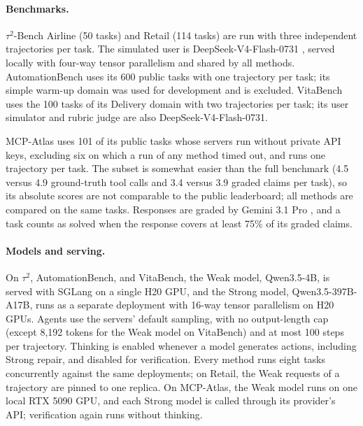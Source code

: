 \documentclass[11pt, copyright, logo, secondlogo]{template/lark}
\begin{document}
\paragraph{Benchmarks.}
$\tau^2$-Bench Airline (50 tasks) and Retail (114 tasks) are run with three
independent trajectories per task. The simulated user is
DeepSeek-V4-Flash-0731 \citep{deepseek2026v4}, served locally with four-way tensor parallelism and
shared by all methods. AutomationBench uses its 600 public tasks with one
trajectory per task; its simple warm-up domain was used for development and
is excluded. VitaBench uses the 100 tasks of its Delivery domain with two
trajectories per task; its user simulator and rubric judge
are also DeepSeek-V4-Flash-0731.

MCP-Atlas uses 101 of its public tasks whose servers run without private API
keys, excluding six on which a run of any method timed out, and
runs one trajectory per task. The subset is somewhat easier than the full
benchmark (4.5 versus 4.9 ground-truth tool calls and 3.4 versus 3.9 graded
claims per task), so its absolute scores are not comparable to the public
leaderboard; all methods are compared on the same tasks. Responses are graded
by Gemini 3.1 Pro \citep{google2026gemini31pro}, and a task counts as solved
when the response covers at least 75\% of its graded claims.

\paragraph{Models and serving.}
On $\tau^2$, AutomationBench, and VitaBench, the Weak model, Qwen3.5-4B, is served with
SGLang on a single H20 GPU, and the Strong model, Qwen3.5-397B-A17B, runs as a
separate deployment with 16-way tensor parallelism on H20 GPUs. Agents use
the servers' default sampling, with no output-length cap (except 8{,}192
tokens for the Weak model on VitaBench) and at most 100
steps per trajectory. Thinking is enabled whenever a model generates actions,
including Strong repair, and disabled for verification. Every method runs
eight tasks concurrently against the same deployments; on Retail, the Weak
requests of a trajectory are pinned to one replica. On MCP-Atlas, the Weak
model runs on one local RTX 5090 GPU, and each Strong model is called through
its provider's API; verification again runs without thinking.
\end{document}
